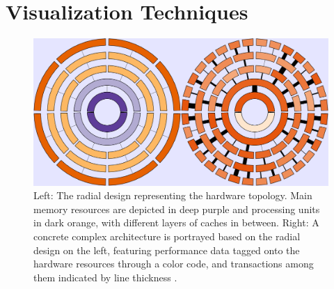 \section{Visualization Techniques}\label{sec:visualization}
\begin{figure}
	\centering
	\includegraphics[width=\linewidth]{pictures/memaxes_cache.png}
	\caption{Left: The radial design representing the hardware topology. Main memory resources are depicted in deep purple and processing units in dark orange, with different layers of caches in between. Right: A concrete complex architecture is portrayed based on the radial design on the left, featuring performance data tagged onto the hardware resources through a color code, and transactions among them indicated by line thickness \cite{gimenez2017memaxes}.}
	\label{fig:memaxes_cache}
\end{figure}
